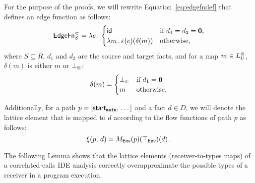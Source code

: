 For the purpose of the proofs, we will rewrite Equation~\eqref{eq:edgefndef} that defines an edge function as follows:
  \begin{equation}\label{eq:edgefnThroughDelta}
    \textsf{EdgeFn}^\Subset_{S}=\lambda e\,.\,
    \begin{cases}
      \textsf{id}&\text{if $d_1=d_2=\mathbf0$,}\\
      \lambda m\,.\,\varepsilon(e)(\delta(m))&\text{otherwise},
    \end{cases}
  \end{equation}
  where $S\subseteq R$, $d_1$ and $d_2$ are the source and target facts, and for a map $m\in L^\Subset_U$, $\delta(m)$ is either $m$ or $\bot_\Subset$:
  \begin{equation}\label{eq:deltadef}
    \delta(m)=\begin{cases}
      \bot_\Subset&\text{if $d_1=\mathbf0$}\\
      m&\text{otherwise.}
    \end{cases}
  \end{equation}

Additionally, for a path $p=[\textsf{start}_\texttt{main},\,\dots]$ and a fact $d\in D$, we will denote the lattice element that is mapped to $d$ according to the flow functions of path $p$ as follows:
\begin{equation}
  \xi(p,\,d)=M_\textsf{Env}(p)(\top_\textsf{Env})(d)\,.
\end{equation}

The following Lemma shows that the lattice elements (receiver-to-types maps) of a correlated-calls IDE analysis correctly overapproximate the possible types of a receiver in a program execution.

